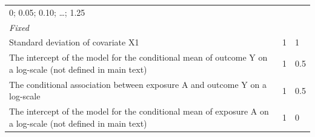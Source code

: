 \documentclass[10,a4paperpaper,]{article}
\begin{document}
\begin{longtable}[]{@{}lll@{}}
\begin{minipage}[t]{0.43\columnwidth}
0; 0.05; 0.10; \ldots; 1.25\strut
\end{minipage}\tabularnewline
\begin{minipage}[t]{0.37\columnwidth}\raggedright
\emph{Fixed}\strut
\end{minipage} & \begin{minipage}[t]{0.12\columnwidth}\raggedright
\strut
\end{minipage} & \begin{minipage}[t]{0.43\columnwidth}\raggedright
\strut
\end{minipage}\tabularnewline
\begin{minipage}[t]{0.37\columnwidth}\raggedright
Standard deviation of covariate X1\strut
\end{minipage} & \begin{minipage}[t]{0.12\columnwidth}\raggedright
1\strut
\end{minipage} & \begin{minipage}[t]{0.43\columnwidth}\raggedright
1\strut
\end{minipage}\tabularnewline
\begin{minipage}[t]{0.37\columnwidth}\raggedright
The intercept of the model for the conditional mean of outcome Y on a
log-scale (not defined in main text)\strut
\end{minipage} & \begin{minipage}[t]{0.12\columnwidth}\raggedright
1\strut
\end{minipage} & \begin{minipage}[t]{0.43\columnwidth}\raggedright
0.5\strut
\end{minipage}\tabularnewline
\begin{minipage}[t]{0.37\columnwidth}\raggedright
The conditional association between exposure A and outcome Y on a
log-scale\strut
\end{minipage} & \begin{minipage}[t]{0.12\columnwidth}\raggedright
1\strut
\end{minipage} & \begin{minipage}[t]{0.43\columnwidth}\raggedright
0.5\strut
\end{minipage}\tabularnewline
\begin{minipage}[t]{0.37\columnwidth}\raggedright
The intercept of the model for the conditional mean of exposure A on a
log-scale (not defined in main text)\strut
\end{minipage} & \begin{minipage}[t]{0.12\columnwidth}\raggedright
1\strut
\end{minipage} & \begin{minipage}[t]{0.43\columnwidth}\raggedright
0\strut
\end{minipage}\tabularnewline
\bottomrule
\end{longtable}
\end{document}

